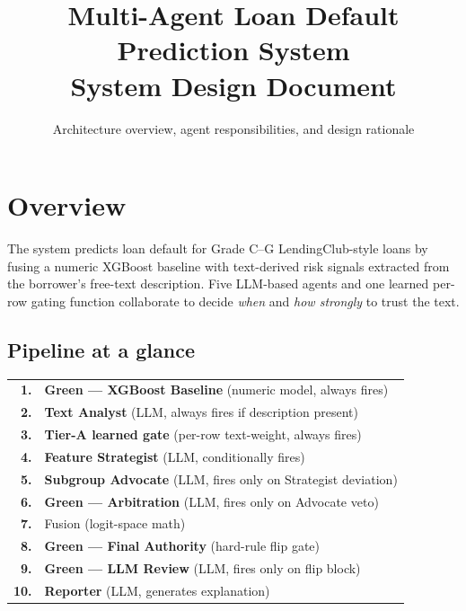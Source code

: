 \documentclass[11pt,a4paper]{article}
\title{
  \vspace{-1cm}
  \textbf{Multi-Agent Loan Default Prediction System}\\
  \large System Design Document
}
\author{Architecture overview, agent responsibilities, and design rationale}
\date{}
\begin{document}
\maketitle
\vspace{-1cm}

\tableofcontents
\vspace{0.5cm}

\section{Overview}
\label{sec:overview}

The system predicts loan default for Grade C--G LendingClub-style loans by
fusing a numeric XGBoost baseline with text-derived risk signals extracted
from the borrower's free-text description. Five LLM-based agents and one
learned per-row gating function collaborate to decide \emph{when} and
\emph{how strongly} to trust the text.

\subsection{Pipeline at a glance}

\begin{center}
\begin{tabular}{rl}
\textbf{1.} & \textbf{Green --- XGBoost Baseline} (numeric model, always fires) \\
\textbf{2.} & \textbf{Text Analyst} (LLM, always fires if description present) \\
\textbf{3.} & \textbf{Tier-A learned gate} (per-row text-weight, always fires) \\
\textbf{4.} & \textbf{Feature Strategist} (LLM, conditionally fires) \\
\textbf{5.} & \textbf{Subgroup Advocate} (LLM, fires only on Strategist deviation) \\
\textbf{6.} & \textbf{Green --- Arbitration} (LLM, fires only on Advocate veto) \\
\textbf{7.} & Fusion (logit-space math) \\
\textbf{8.} & \textbf{Green --- Final Authority} (hard-rule flip gate) \\
\textbf{9.} & \textbf{Green --- LLM Review} (LLM, fires only on flip block) \\
\textbf{10.} & \textbf{Reporter} (LLM, generates explanation)
\end{tabular}
\end{center}
\end{document}
